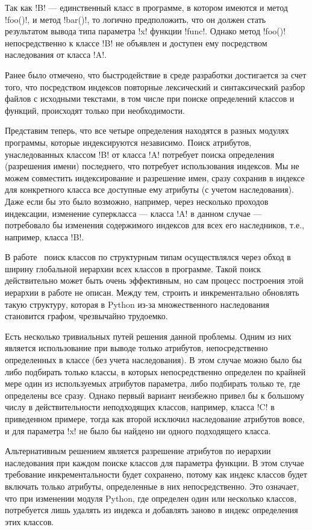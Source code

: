 Так как !B! --- единственный класс в программе, в котором имеются и метод
!foo()!, и метод !bar()!, то логично предположить, что он должен стать
результатом вывода типа параметра !x!  функции !func!. Однако метод !foo()!
непосредственно к классе !B!  не объявлен и доступен ему посредством
наследования от класса !A!. 

Ранее было отмечено, что быстродействие в среде
разработки достигается за счет того, что посредством индексов повторные
лексический и синтаксический разбор файлов с исходными текстами, в том числе при
поиске определений классов и функций, происходят только при необходимости. 

Представим теперь, что все четыре определения находятся в разных модулях
программы, которые индексируются независимо. Поиск атрибутов, унаследованных
классом !B! от класса !A! потребует поиска определения (разрешения имени) последнего, 
что потребует использования индексов. Мы не можем совместить
индексирование и разрешение имен, сразу сохранив в индексе для конкретного
класса все доступные ему атрибуты (с учетом наследования).  Даже если бы это
было возможно, например, через несколько проходов индексации, изменение
суперкласса --- класса !A! в данном случае --- потребовало бы изменения
содержимого индексов для всех его наследников, т.е., например, класса !B!. 

В работе~\cite{Pluquet2009} поиск классов по структурным типам осуществлялся
через обход в ширину глобальной иерархии всех классов в программе. Такой поиск
действительно может быть очень эффективным, но сам процесс построения этой
иерархии в работе не описан. Между тем, строить и инкрементально обновлять такую
структуру, которая в Python из-за множественного наследования становится графом,
чрезвычайно трудоемко.

Есть несколько тривиальных путей решения данной проблемы. Одним из них является
использование при выводе только атрибутов, непосредственно определенных в классе
(без учета наследования). В этом случае можно было бы либо подбирать только
классы, в которых непосредственно определен по крайней мере один из используемых
атрибутов параметра, либо подбирать только те, где определены все сразу. Однако
первый вариант неизбежно привел бы к большому числу в действительности
неподходящих классов, например, класса !C! в приведенном примере, тогда как второй
исключил наследование атрибутов вовсе, и для параметра !x! не было бы
найдено ни одного подходящего класса.

Альтернативным решением является разрешение атрибутов по иерархии наследования
при каждом поиске классов для параметра функции. В этом случае требование
инкрементальности будет сохранено, потому как индекс классов будет включать
только атрибуты, определенные в них непосредственно. Это означает, что при
изменении модуля Python, где определен один или несколько классов, потребуется
лишь удалять из индекса и добавлять заново в индекс определения этих классов.

